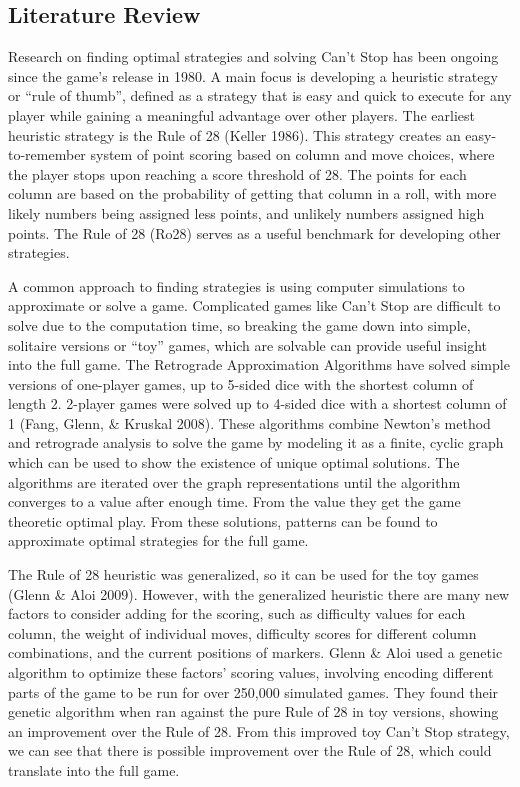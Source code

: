 \documentclass[12pt]{article}
\begin{document}
\begin{thesis}
\newpage

\section{Literature Review}\label{lit-rev}

Research on finding optimal strategies and solving Can't Stop has been ongoing since the game's release in 1980.
A main focus is developing a heuristic strategy or ``rule of thumb'', defined as a strategy that is easy and quick to execute for any player while gaining a meaningful advantage over other players.
The earliest heuristic strategy is the Rule of 28 (Keller 1986).
This strategy creates an easy-to-remember system of point scoring based on column and move choices, where the player stops upon reaching a score threshold of 28.
The points for each column are based on the probability of getting that column in a roll, with more likely numbers being assigned less points, and unlikely numbers assigned high points.
The Rule of 28 (Ro28) serves as a useful benchmark for developing other strategies.

A common approach to finding strategies is using computer simulations to approximate or solve a game.
Complicated games like Can't Stop are difficult to solve due to the computation time, so breaking the game down into simple, solitaire versions or ``toy'' games, which are solvable can provide useful insight into the full game.
The Retrograde Approximation Algorithms have solved simple versions of one-player games, up to 5-sided dice with the shortest column of length 2.
2-player games were solved up to 4-sided dice with a shortest column of 1 (Fang, Glenn, \& Kruskal 2008).
These algorithms combine Newton's method and retrograde analysis to solve the game by modeling it as a finite, cyclic graph which can be used to show the existence of unique optimal solutions.
The algorithms are iterated over the graph representations until the algorithm converges to a value after enough time.
From the value they get the game theoretic optimal play.
From these solutions, patterns can be found to approximate optimal strategies for the full game.

The Rule of 28 heuristic was generalized, so it can be used for the toy games (Glenn \& Aloi 2009).
However, with the generalized heuristic there are many new factors to consider adding for the scoring, such as difficulty values for each column, the weight of individual moves, difficulty scores for different column combinations, and the current positions of markers.
Glenn \& Aloi used a genetic algorithm to optimize these factors' scoring values, involving encoding different parts of the game to be run for over 250,000 simulated games.
They found their genetic algorithm when ran against the pure Rule of 28 in toy versions, showing an improvement over the Rule of 28.
From this improved toy Can't Stop strategy, we can see that there is possible improvement over the Rule of 28, which could translate into the full game.


\end{thesis}
\end{document}
